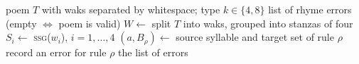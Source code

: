 \documentclass[border=6pt]{standalone}
\begin{document}
\begin{minipage}{\textwidth}
\vspace{2pt}
\begin{algorithmic}[1]
\REQUIRE poem $T$ with waks separated by whitespace; type $k\in\{4,8\}$
\ENSURE list of rhyme errors (empty $\Leftrightarrow$ poem is valid)
\STATE $W\gets$ split $T$ into waks, grouped into stanzas of four
  \STATE $S_i\gets$ \textsc{ssg}($w_i$), $i=1,\ldots,4$ 
    \STATE $(a,B_\rho)\gets$ source syllable and target set of rule $\rho$
      \STATE record an error for rule $\rho$
    \ENDIF
  \ENDFOR
\ENDFOR
\RETURN the list of errors
\end{algorithmic}
\end{minipage}
\end{document}
